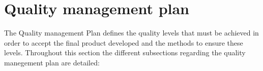\chapter{Quality management plan}
The Quality management Plan defines the quality levels that must be achieved in order to accept the final product developed and the methods to ensure these levels. Throughout this section the different subsections regarding the quality manegement plan are detailed: 



